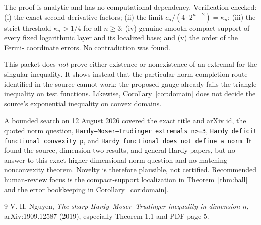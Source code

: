 \documentclass[11pt]{article}
\newcommand{\kap}{\kappa_n}
\begin{document}
The proof is analytic and has no computational dependency.  Verification
checked: (i) the exact second derivative factors; (ii) the limit
$c_n/(4\cdot2^{n-2})=\kap$; (iii) the strict threshold
$\kap>1/4$ for all $n\ge3$; (iv) genuine smooth compact support of every fixed
logarithmic layer and its localized base; and (v) the order of the Fermi-
coordinate errors.  No contradiction was found.

This packet does \emph{not} prove either existence or nonexistence of an
extremal for the singular inequality.  It shows instead that the particular
norm-completion route identified in the source cannot work: the proposed
gauge already fails the triangle inequality on test functions.  Likewise,
Corollary~\ref{cor:domain} does not decide the source's exponential inequality
on convex domains.

A bounded search on 12 August 2026 covered the exact title and arXiv id, the
quoted norm question, \texttt{Hardy--Moser--Trudinger extremals n>=3},
\texttt{Hardy deficit functional convexity p}, and
\texttt{Hardy functional does not define a norm}.  It found the source,
dimension-two results, and general Hardy papers, but no answer to this exact
higher-dimensional norm question and no matching nonconvexity theorem.
Novelty is therefore plausible, not certified.  Recommended human-review
focus is the compact-support localization in Theorem~\ref{thm:ball} and the
error bookkeeping in Corollary~\ref{cor:domain}.

\begin{thebibliography}{9}
V. H. Nguyen,
\emph{The sharp Hardy--Moser--Trudinger inequality in dimension $n$},
arXiv:1909.12587 (2019), especially Theorem 1.1 and PDF page 5.
\end{thebibliography}
\end{document}
